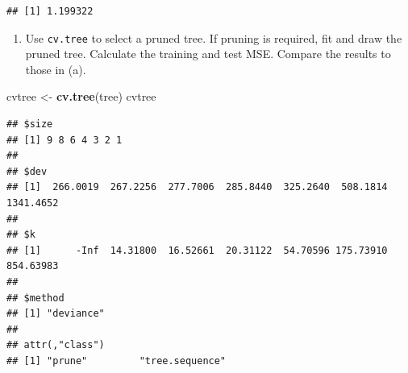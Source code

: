 \documentclass[]{article}
\newenvironment{Shaded}{\begin{snugshade}}{\end{snugshade}}
\newcommand{\DataTypeTok}[1]{\textcolor[rgb]{0.13,0.29,0.53}{#1}}
\newcommand{\DecValTok}[1]{\textcolor[rgb]{0.00,0.00,0.81}{#1}}
\newcommand{\KeywordTok}[1]{\textcolor[rgb]{0.13,0.29,0.53}{\textbf{#1}}}
\newcommand{\NormalTok}[1]{#1}
\newcommand{\OperatorTok}[1]{\textcolor[rgb]{0.81,0.36,0.00}{\textbf{#1}}}
\newcommand{\StringTok}[1]{\textcolor[rgb]{0.31,0.60,0.02}{#1}}
\providecommand{\tightlist}{%
  \setlength{\itemsep}{0pt}\setlength{\parskip}{0pt}}
\begin{document}
\begin{verbatim}
## [1] 1.199322
\end{verbatim}

\begin{enumerate}
\def\labelenumi{(\alph{enumi})}
\setcounter{enumi}{1}
\tightlist
\item
  Use \texttt{cv.tree} to select a pruned tree. If pruning is required,
  fit and draw the pruned tree. Calculate the training and test MSE.
  Compare the results to those in (a).
\end{enumerate}

\begin{Shaded}
\begin{Highlighting}[]
\NormalTok{cvtree <-}\StringTok{ }\KeywordTok{cv.tree}\NormalTok{(tree)}
\NormalTok{cvtree}
\end{Highlighting}
\end{Shaded}

\begin{verbatim}
## $size
## [1] 9 8 6 4 3 2 1
## 
## $dev
## [1]  266.0019  267.2256  277.7006  285.8440  325.2640  508.1814 1341.4652
## 
## $k
## [1]      -Inf  14.31800  16.52661  20.31122  54.70596 175.73910 854.63983
## 
## $method
## [1] "deviance"
## 
## attr(,"class")
## [1] "prune"         "tree.sequence"
\end{verbatim}

\begin{Shaded}
\end{Shaded}
\end{document}
